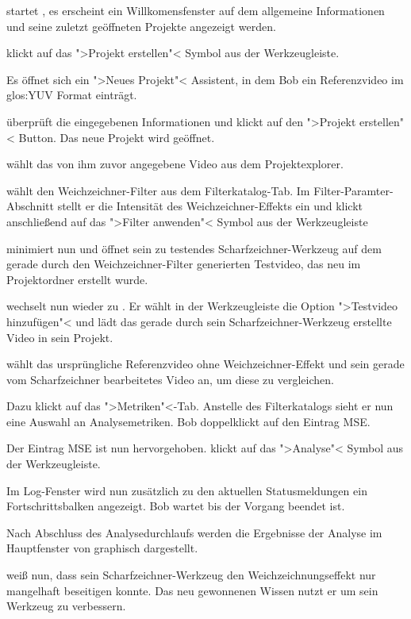  \begin{compactenum}[1]
\item \dAU  startet \projektTitel, es erscheint ein Willkomensfenster auf dem allgemeine Informationen und seine zuletzt geöffneten Projekte angezeigt werden.
\item \dAU  klickt auf das ">Projekt erstellen"< Symbol aus der Werkzeugleiste.
\item Es öffnet sich ein ">Neues Projekt"< Assistent, in dem Bob ein Referenzvideo im \gls{glos:YUV} Format einträgt.
\item \dAU  überprüft die eingegebenen Informationen und klickt auf den ">Projekt erstellen"< Button. Das neue Projekt wird geöffnet.
\item \dAU  wählt das von ihm zuvor angegebene Video aus dem Projektexplorer.
\item \dAU  wählt den Weichzeichner-Filter aus dem Filterkatalog-Tab. Im Filter-Paramter-Abschnitt stellt er die Intensität des Weichzeichner-Effekts ein und klickt anschließend auf das ">Filter anwenden"< Symbol aus der Werkzeugleiste 
\item \dAU  minimiert nun \projektTitel und öffnet sein zu testendes Scharfzeichner-Werkzeug auf dem gerade durch den Weichzeichner-Filter generierten Testvideo, das neu im Projektordner erstellt wurde.
\item \dAU  wechselt nun wieder zu \projektTitel. Er wählt in der Werkzeugleiste die Option ">Testvideo hinzufügen"< und lädt das gerade durch sein Scharfzeichner-Werkzeug erstellte Video in sein Projekt.
\item \dAU  wählt das ursprüngliche Referenzvideo ohne Weichzeichner-Effekt und sein gerade vom Scharfzeichner bearbeitetes Video an, um diese zu vergleichen.
\item Dazu klickt \dAU  auf das ">Metriken"<-Tab. Anstelle des Filterkatalogs sieht er nun eine Auswahl an Analysemetriken. Bob doppelklickt auf den Eintrag \gls{MSE}.
\item Der Eintrag \gls{MSE} ist nun hervorgehoben. \dAU  klickt auf das ">Analyse"< Symbol aus der Werkzeugleiste.
\item Im Log-Fenster wird nun zusätzlich zu den aktuellen Statusmeldungen ein Fortschrittsbalken angezeigt. Bob wartet bis der Vorgang beendet ist.
\item Nach Abschluss des Analysedurchlaufs werden \dAU  die Ergebnisse der Analyse im Hauptfenster von \projektTitel graphisch dargestellt.
\item \dAU  weiß nun, dass sein Scharfzeichner-Werkzeug den Weichzeichnungseffekt nur mangelhaft beseitigen konnte. Das neu gewonnenen Wissen nutzt er um sein Werkzeug zu verbessern.
\end{compactenum}
